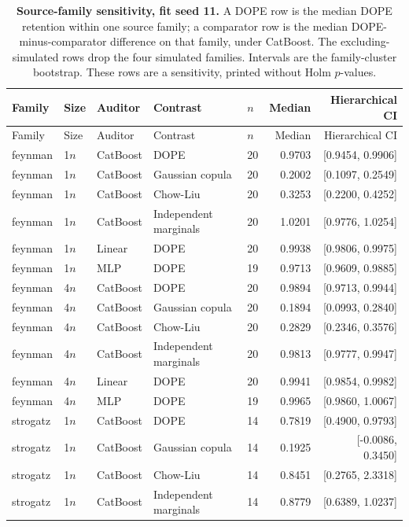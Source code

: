 \begin{longtable}{lllllrr}
\caption{\textbf{Source-family sensitivity, fit seed 11.} A DOPE row is the median DOPE retention within one source family; a comparator row is the median DOPE-minus-comparator difference on that family, under CatBoost. The excluding-simulated rows drop the four simulated families. Intervals are the family-cluster bootstrap. These rows are a sensitivity, printed without Holm $p$-values.}\label{tab:review-family}\\
\toprule
Family & Size & Auditor & Contrast & $n$ & Median & Hierarchical CI \\
\midrule
\endfirsthead
\toprule
Family & Size & Auditor & Contrast & $n$ & Median & Hierarchical CI \\
\midrule
\endhead
feynman & 1$n$ & CatBoost & DOPE & 20 & 0.9703 & [0.9454, 0.9906] \\
feynman & 1$n$ & CatBoost & Gaussian copula & 20 & 0.2002 & [0.1097, 0.2549] \\
feynman & 1$n$ & CatBoost & Chow-Liu & 20 & 0.3253 & [0.2200, 0.4252] \\
feynman & 1$n$ & CatBoost & Independent marginals & 20 & 1.0201 & [0.9776, 1.0254] \\
feynman & 1$n$ & Linear & DOPE & 20 & 0.9938 & [0.9806, 0.9975] \\
feynman & 1$n$ & MLP & DOPE & 19 & 0.9713 & [0.9609, 0.9885] \\
feynman & 4$n$ & CatBoost & DOPE & 20 & 0.9894 & [0.9713, 0.9944] \\
feynman & 4$n$ & CatBoost & Gaussian copula & 20 & 0.1894 & [0.0993, 0.2840] \\
feynman & 4$n$ & CatBoost & Chow-Liu & 20 & 0.2829 & [0.2346, 0.3576] \\
feynman & 4$n$ & CatBoost & Independent marginals & 20 & 0.9813 & [0.9777, 0.9947] \\
feynman & 4$n$ & Linear & DOPE & 20 & 0.9941 & [0.9854, 0.9982] \\
feynman & 4$n$ & MLP & DOPE & 19 & 0.9965 & [0.9860, 1.0067] \\
strogatz & 1$n$ & CatBoost & DOPE & 14 & 0.7819 & [0.4900, 0.9793] \\
strogatz & 1$n$ & CatBoost & Gaussian copula & 14 & 0.1925 & [-0.0086, 0.3450] \\
strogatz & 1$n$ & CatBoost & Chow-Liu & 14 & 0.8451 & [0.2765, 2.3318] \\
strogatz & 1$n$ & CatBoost & Independent marginals & 14 & 0.8779 & [0.6389, 1.0237] \\

\end{longtable}

